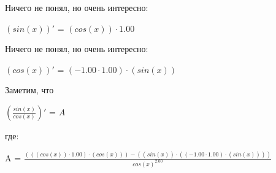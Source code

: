\documentclass{article}
\begin{document}
Ничего не понял, но очень интересно:

$(sin(x))'$ = $(cos(x)) \cdot 1.00$

Ничего не понял, но очень интересно:

$(cos(x))'$ = $(-1.00 \cdot 1.00) \cdot (sin(x))$

Заметим, что

$(\frac{sin(x)}{cos(x)})'$ = $A$

где:

A = $\frac{(((cos(x)) \cdot 1.00) \cdot (cos(x))) - ((sin(x)) \cdot ((-1.00 \cdot 1.00) \cdot (sin(x))))}{{cos(x)}^{2.00}}$



\begin{figure}[h]\label{fig:t}\end{figure}
\end{document}
